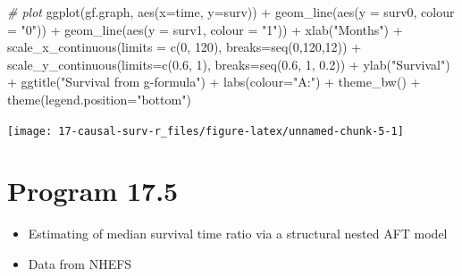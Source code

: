 \documentclass[
  10pt,
]{book}
\newenvironment{Shaded}{\begin{snugshade}}{\end{snugshade}}
\newcommand{\AttributeTok}[1]{\textcolor[rgb]{0.77,0.63,0.00}{#1}}
\newcommand{\CommentTok}[1]{\textcolor[rgb]{0.56,0.35,0.01}{\textit{#1}}}
\newcommand{\DecValTok}[1]{\textcolor[rgb]{0.00,0.00,0.81}{#1}}
\newcommand{\FloatTok}[1]{\textcolor[rgb]{0.00,0.00,0.81}{#1}}
\newcommand{\FunctionTok}[1]{\textcolor[rgb]{0.00,0.00,0.00}{#1}}
\newcommand{\NormalTok}[1]{#1}
\newcommand{\SpecialCharTok}[1]{\textcolor[rgb]{0.00,0.00,0.00}{#1}}
\newcommand{\StringTok}[1]{\textcolor[rgb]{0.31,0.60,0.02}{#1}}
\providecommand{\tightlist}{%
  \setlength{\itemsep}{0pt}\setlength{\parskip}{0pt}}
\begin{document}
\begin{Shaded}
\begin{Highlighting}[]
\CommentTok{\# plot}
\FunctionTok{ggplot}\NormalTok{(gf.graph, }\FunctionTok{aes}\NormalTok{(}\AttributeTok{x=}\NormalTok{time, }\AttributeTok{y=}\NormalTok{surv)) }\SpecialCharTok{+} 
  \FunctionTok{geom\_line}\NormalTok{(}\FunctionTok{aes}\NormalTok{(}\AttributeTok{y =}\NormalTok{ surv0, }\AttributeTok{colour =} \StringTok{"0"}\NormalTok{)) }\SpecialCharTok{+} 
  \FunctionTok{geom\_line}\NormalTok{(}\FunctionTok{aes}\NormalTok{(}\AttributeTok{y =}\NormalTok{ surv1, }\AttributeTok{colour =} \StringTok{"1"}\NormalTok{)) }\SpecialCharTok{+} 
  \FunctionTok{xlab}\NormalTok{(}\StringTok{"Months"}\NormalTok{) }\SpecialCharTok{+} 
  \FunctionTok{scale\_x\_continuous}\NormalTok{(}\AttributeTok{limits =} \FunctionTok{c}\NormalTok{(}\DecValTok{0}\NormalTok{, }\DecValTok{120}\NormalTok{), }\AttributeTok{breaks=}\FunctionTok{seq}\NormalTok{(}\DecValTok{0}\NormalTok{,}\DecValTok{120}\NormalTok{,}\DecValTok{12}\NormalTok{)) }\SpecialCharTok{+}
  \FunctionTok{scale\_y\_continuous}\NormalTok{(}\AttributeTok{limits=}\FunctionTok{c}\NormalTok{(}\FloatTok{0.6}\NormalTok{, }\DecValTok{1}\NormalTok{), }\AttributeTok{breaks=}\FunctionTok{seq}\NormalTok{(}\FloatTok{0.6}\NormalTok{, }\DecValTok{1}\NormalTok{, }\FloatTok{0.2}\NormalTok{)) }\SpecialCharTok{+}
  \FunctionTok{ylab}\NormalTok{(}\StringTok{"Survival"}\NormalTok{) }\SpecialCharTok{+} 
  \FunctionTok{ggtitle}\NormalTok{(}\StringTok{"Survival from g{-}formula"}\NormalTok{) }\SpecialCharTok{+} 
  \FunctionTok{labs}\NormalTok{(}\AttributeTok{colour=}\StringTok{"A:"}\NormalTok{) }\SpecialCharTok{+}
  \FunctionTok{theme\_bw}\NormalTok{() }\SpecialCharTok{+} 
  \FunctionTok{theme}\NormalTok{(}\AttributeTok{legend.position=}\StringTok{"bottom"}\NormalTok{)}
\end{Highlighting}
\end{Shaded}

\begin{center}\texttt{[image: 17-causal-surv-r\_files/figure-latex/unnamed-chunk-5-1]} \end{center}

\hypertarget{program-17.5}{%
\section{Program 17.5}\label{program-17.5}}

\begin{itemize}
\tightlist
\item
  Estimating of median survival time ratio via a structural nested AFT model
\item
  Data from NHEFS
\end{itemize}
\end{document}
